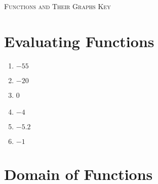 \newpage

\textsc{Functions and Their Graphs Key}	

\section*{Evaluating Functions}

\begin{enumerate}
	\item $-55$
	\item $-20$
	\item 0
	\item $-4$
	\item $-5.2$
	\item $-1$
\end{enumerate}

\section*{Domain of Functions}


